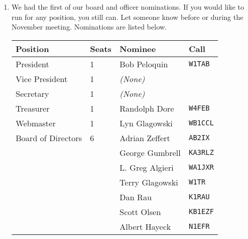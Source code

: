 \documentclass[10pt,letterpaper]{article}
\begin{document}
\begin{enumerate}
  \item We had the first of our board and officer nominations. If you would like to run for any position, you still can. Let someone know before or during the November meeting. Nominations are listed below.\\

  \begin{tabular}{|ll|ll|}
    \hline
    \textbf{Position} & \textbf{Seats} & \textbf{Nominee} & \textbf{Call} \\ \hline
    President & 1 & Bob Peloquin & \texttt{W1TAB} \\ \hline
    Vice President & 1 & \emph{(None)} & \\ \hline
    Secretary & 1 & \emph{(None)} & \\ \hline
    Treasurer & 1 & Randolph Dore & \texttt{W4FEB} \\ \hline
    Webmaster & 1 & Lyn Glagowski & \texttt{WB1CCL} \\ \hline
    Board of Directors & 6 & Adrian Zeffert & \texttt{AB2IX} \\
    & & George Gumbrell& \texttt{KA3RLZ} \\
    & & L. Greg Algieri & \texttt{WA1JXR} \\
    & & Terry Glagowski & \texttt{W1TR} \\
    & & Dan Rau & \texttt{K1RAU} \\
    & & Scott Olsen & \texttt{KB1EZF} \\
    & & Albert Hayeck & \texttt{N1EFR} \\ \hline
  \end{tabular}


\end{enumerate}
\end{document}
